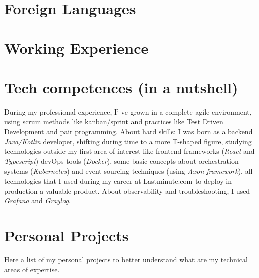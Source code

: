 \documentclass[letterpaper]{twentysecondcv} %
\begin{document}
\section{Foreign Languages}

\begin{twenty}
\end{twenty}


\section{Working Experience}

\begin{twenty}
\end{twenty}

\section{Tech competences (in a nutshell)}

During my professional experience, I' ve grown in a complete agile environment, using scrum methods like kanban/sprint and practices like Test Driven Development and pair programming. \newline 
About hard skills: I was born as a backend \emph{Java/Kotlin} developer, shifting during time to a more T-shaped figure, studying technologies outside my first area of interest like frontend frameworks (\emph{React} and \emph{Typescript}) devOps tools (\emph{Docker}), some basic concepts about orchestration systems (\emph{Kubernetes}) and event sourcing techniques (using \emph{Axon framework}), all technologies that I used during my career at Lastminute.com to deploy in production a valuable product.\newline
About observability and troubleshooting, I used \emph{Grafana} and \emph{Graylog}.\newline

\section{Personal Projects}
\newline\newline
Here a list of my personal projects to better understand what are my technical areas of expertise.
\end{document}
